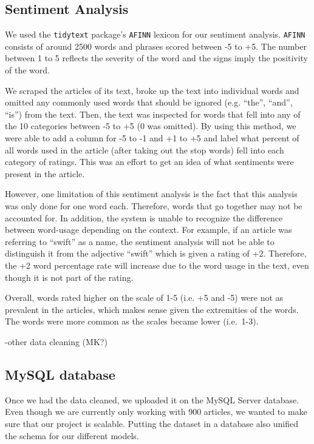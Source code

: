 \documentclass[10pt,letterpaper]{article}
\begin{document}
\subsection{Sentiment Analysis}\label{sentiment-analysis}

We used the \texttt{tidytext} package's \texttt{AFINN} lexicon for our
sentiment analysis. \texttt{AFINN} consists of around 2500 words and
phrases scored between -5 to +5. The number between 1 to 5 reflects the
severity of the word and the signs imply the positivity of the word.

We scraped the articles of its text, broke up the text into individual
words and omitted any commonly used words that should be ignored (e.g.
``the'', ``and'', ``is'') from the text. Then, the text was inspected
for words that fell into any of the 10 categories between -5 to +5 (0
was omitted). By using this method, we were able to add a column for -5
to -1 and +1 to +5 and label what percent of all words used in the
article (after taking out the stop words) fell into each category of
ratings. This was an effort to get an idea of what sentiments were
present in the article.

However, one limitation of this sentiment analysis is the fact that this
analysis was only done for one word each. Therefore, words that go
together may not be accounted for. In addition, the system is unable to
recognize the difference between word-usage depending on the context.
For example, if an article was referring to ``swift'' as a name, the
sentiment analysis will not be able to distinguish it from the adjective
``swift'' which is given a rating of +2. Therefore, the +2 word
percentage rate will increase due to the word usage in the text, even
though it is not part of the rating.

Overall, words rated higher on the scale of 1-5 (i.e. +5 and -5) were
not as prevalent in the articles, which makes sense given the
extremities of the words. The words were more common as the scales
became lower (i.e.~1-3).

-other data cleaning (MK?)

\subsection{MySQL database}\label{mysql-database}

Once we had the data cleaned, we uploaded it on the MySQL Server
database. Even though we are currently only working with 900 articles,
we wanted to make sure that our project is scalable. Putting the dataset
in a database also unified the schema for our different models.
\end{document}
